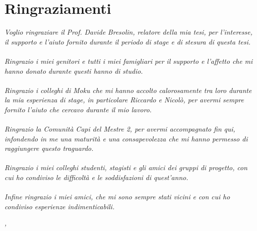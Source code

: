 
\cleardoublepage
{}

\begingroup
\let\clearpage\relax
\let\cleardoublepage\relax
\let\cleardoublepage\relax

\chapter*{Ringraziamenti}
\textit{Voglio ringraziare il Prof. Davide Bresolin, relatore della mia tesi, per l'interesse, il supporto e l'aiuto fornito durante il periodo di stage e di stesura di questa tesi.} \\
\\
\textit{Ringrazio i miei genitori e tutti i miei famigliari per il supporto e l'affetto che mi hanno donato durante questi hanno di studio.} \\
\\
\textit{Ringrazio i colleghi di Moku che mi hanno accolto calorosamente tra loro durante la mia esperienza di stage, in particolare Riccardo e Nicolò, per avermi sempre fornito l'aiuto che cercavo durante il mio lavoro.} \\
\\
\textit{Ringrazio la Comunità Capi del Mestre 2, per avermi accompagnato fin qui, infondendo in me una maturità e una consapevolezza che mi hanno permesso di raggiungere questo traguardo.} \\
\\
\textit{Ringrazio i miei colleghi studenti, stagisti e gli amici dei gruppi di progetto, con cui ho condiviso le difficoltà e le soddisfazioni di quest'anno.} \\
\\
\textit{Infine ringrazio i miei amici, che mi sono sempre stati vicini e con cui ho condiviso esperienze indimenticabili.} \\
\bigskip

\noindent\textit{\myLocation, \myTime}
\hfill \myName

\endgroup


